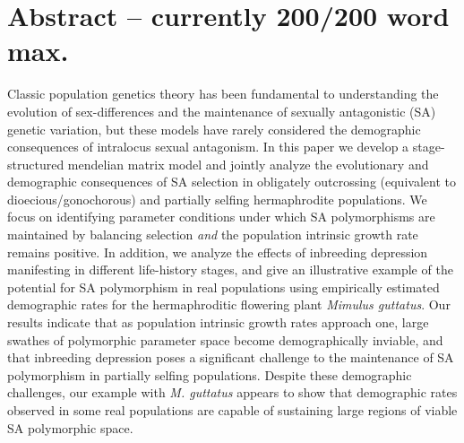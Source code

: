\documentclass[11pt]{article}
\begin{document}
\newpage{}
\section*{Abstract -- currently 200/200 word max.}%

Classic population genetics theory has been fundamental to understanding the evolution of sex-differences and the maintenance of sexually antagonistic (SA) genetic variation, but these models have rarely considered the demographic consequences of intralocus sexual antagonism. In this paper we develop a stage-structured mendelian matrix model and jointly analyze the evolutionary and demographic consequences of SA selection in obligately outcrossing (equivalent to dioecious/gonochorous) and partially selfing hermaphrodite populations. We focus on identifying parameter conditions under which SA polymorphisms are maintained by balancing selection {\itshape and} the population intrinsic growth rate remains positive. In addition, we analyze the effects of inbreeding depression manifesting in different life-history stages, and give an illustrative example of the potential for SA polymorphism in real populations using empirically estimated demographic rates for the hermaphroditic flowering plant {\itshape Mimulus guttatus}. Our results indicate that as population intrinsic growth rates approach one, large swathes of polymorphic parameter space become demographically inviable, and that inbreeding depression poses a significant challenge to the maintenance of SA polymorphism in partially selfing populations. Despite these demographic challenges, our example with {\itshape M. guttatus} appears to show that demographic rates observed in some real populations are capable of sustaining large regions of viable SA polymorphic space.
\end{document}
